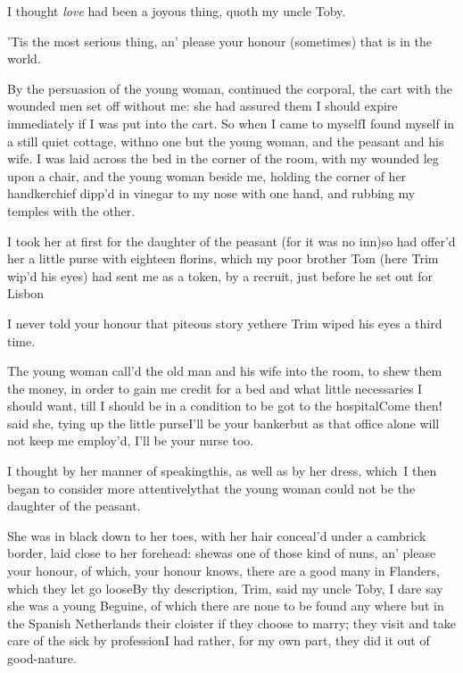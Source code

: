 \documentclass{article}
\begin{document}
I thought \textit{love} had been a joyous thing, quoth my uncle
Toby.

’Tis the most serious thing, an’ please your honour
(sometimes) that is in the world.

By the persuasion of the young woman, continued the corporal,
the cart with the wounded men set off without me: she had assured
them I should expire immediately if I was put into the cart. So
when I came to myself\tsh I found myself in a still quiet
cottage, with\pb no one but the young woman, and the peasant and his
wife. I was laid across the bed in the corner of the room, with my
wounded leg upon a chair, and the young woman beside me, holding
the corner of her handkerchief dipp’d in vinegar to my nose
with one hand, and rubbing my temples with the other.

I took her at first for the daughter of the peasant (for it was
no inn)\tsk so had offer’d her a little purse with eighteen
florins, which my poor brother Tom (here Trim
wip’d his eyes) had sent me as a token, by a recruit, just before he set out for
Lisbon\tsh

\tsh I never told your honour that piteous story
yet\tsh here Trim wiped his eyes a third time.

The young woman call’d the old man and his wife into the
room, to shew them the money, in order to gain me credit for a bed
and what little necessaries I should want, till I should be in a
condition to be got to the hospital\tsh Come then! said
she, tying up the little purse\tsk I’ll be your
banker\tsk but as that office alone will not keep me
employ’d, I’ll be your nurse too.

I thought by her manner of speaking\break this, as well as by her
dress, which~I then began to consider more
attentively\tsh that the young woman could not be the
daughter of the peasant.

She was in black down to her toes, with her hair conceal’d
under a cambrick border, laid close to her forehead: she\pb was one of
those kind of nuns, an’ please your honour, of which, your
honour knows, there are a good many in Flanders,
which they let go loose\tsh By thy description,
Trim, said my uncle Toby, I dare say she was a young
Beguine, of which there are none to be found any where but
in the Spanish Netherlands\tsk\break
{}
their cloister if they choose to marry; they visit
and take care of the sick by profession\tsh I had rather,
for my own part, they did it out of good-nature.
\end{document}
